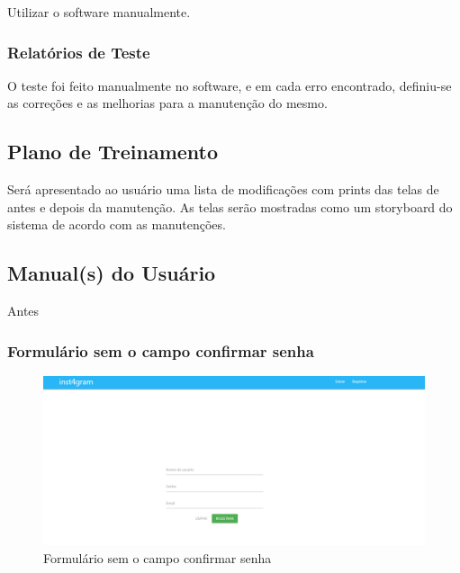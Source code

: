 Utilizar o software manualmente.

\subsubsection{Relatórios de Teste}
O teste foi feito manualmente no software, e em cada erro encontrado, definiu-se as correções e as melhorias para a manutenção do mesmo.

\subsection{Plano de Treinamento}

 Será apresentado ao usuário uma lista de modificações com prints das telas de antes e depois da manutenção. 
 As telas serão mostradas como um storyboard do sistema de acordo com as manutenções.

\subsection{Manual(s) do Usuário}
Antes
\subsubsection{Formulário sem o campo confirmar senha}
\begin{figure}[ht]
	\centering
	\includegraphics[width=\textwidth]{./imagens/confirmacao_senha.png}
	\caption{Formulário sem o campo confirmar senha}
	\label{fig:casoDeUso}
\end{figure}

\pagebreak

